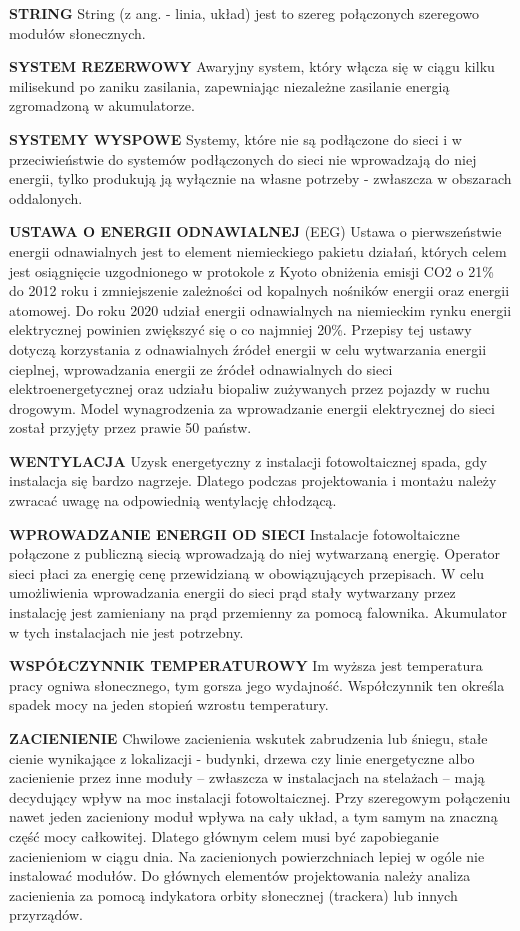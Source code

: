 \documentclass[12pt,a4paper]{article}
\begin{document}
\textbf{STRING}
String (z ang. - linia, układ) jest to szereg połączonych szeregowo modułów słonecznych.


\textbf{SYSTEM REZERWOWY}
Awaryjny system, który włącza się w ciągu kilku milisekund po zaniku zasilania, zapewniając niezależne zasilanie energią zgromadzoną w akumulatorze.


\textbf{SYSTEMY WYSPOWE}
Systemy, które nie są podłączone do sieci i w przeciwieństwie do systemów podłączonych do sieci nie wprowadzają do niej energii, tylko produkują ją wyłącznie na własne potrzeby - zwłaszcza w obszarach oddalonych.


\textbf{USTAWA O ENERGII ODNAWIALNEJ} (EEG)
Ustawa o pierwszeństwie energii odnawialnych jest to element niemieckiego pakietu działań, których celem jest osiągnięcie uzgodnionego w protokole z Kyoto obniżenia emisji CO2 o 21\% do 2012 roku i zmniejszenie zależności od kopalnych nośników energii oraz energii atomowej. Do roku 2020 udział energii odnawialnych na niemieckim rynku energii elektrycznej powinien zwiększyć się o co najmniej 20\%. Przepisy tej ustawy dotyczą korzystania z odnawialnych źródeł energii w celu wytwarzania energii cieplnej, wprowadzania energii ze źródeł odnawialnych do sieci elektroenergetycznej oraz udziału biopaliw zużywanych przez pojazdy w ruchu drogowym. Model wynagrodzenia za wprowadzanie energii elektrycznej do sieci został przyjęty przez prawie 50 państw.


\textbf{WENTYLACJA}
Uzysk energetyczny z instalacji fotowoltaicznej spada, gdy instalacja się bardzo nagrzeje. Dlatego podczas projektowania i montażu należy zwracać uwagę na odpowiednią wentylację chłodzącą.


\textbf{WPROWADZANIE ENERGII OD SIECI}
Instalacje fotowoltaiczne połączone z publiczną siecią wprowadzają do niej wytwarzaną energię. Operator sieci płaci za energię cenę przewidzianą w obowiązujących przepisach. W celu umożliwienia wprowadzania energii do sieci prąd stały wytwarzany przez instalację jest zamieniany na prąd przemienny za pomocą falownika. Akumulator w tych instalacjach nie jest potrzebny.


\textbf{WSPÓŁCZYNNIK TEMPERATUROWY}
Im wyższa jest temperatura pracy ogniwa słonecznego, tym gorsza jego wydajność. Współczynnik ten określa spadek mocy na jeden stopień wzrostu temperatury.


\textbf{ZACIENIENIE}
Chwilowe zacienienia wskutek zabrudzenia lub śniegu, stałe cienie wynikające z lokalizacji - budynki, drzewa czy linie energetyczne albo zacienienie przez inne moduły – zwłaszcza w instalacjach na stelażach – mają decydujący wpływ na moc instalacji fotowoltaicznej. Przy szeregowym połączeniu nawet jeden zacieniony moduł wpływa na cały układ, a tym samym na znaczną część mocy całkowitej. Dlatego głównym celem musi być zapobieganie zacienieniom w ciągu dnia. Na zacienionych powierzchniach lepiej w ogóle nie instalować modułów. Do głównych elementów projektowania należy analiza zacienienia za pomocą indykatora orbity słonecznej (trackera) lub innych przyrządów.
\end{document}
